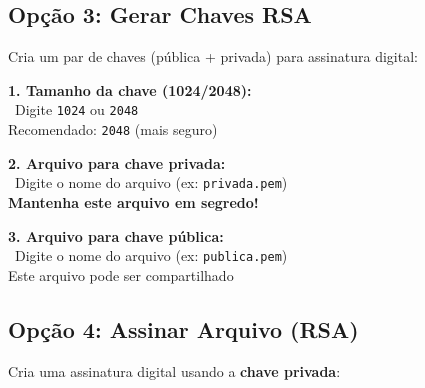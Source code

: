 \documentclass[12pt,a4paper]{article}
\begin{document}
\subsection{Opção 3: Gerar Chaves RSA}

Cria um par de chaves (pública + privada) para assinatura digital:

\begin{tcolorbox}[colback=warningorange!10,colframe=warningorange,title={\faKey\ Campos para Geração RSA}]

\textbf{1. Tamanho da chave (1024/2048):}\\
\quad \faHashtag\ Digite \texttt{1024} ou \texttt{2048}\\
\quad Recomendado: \texttt{2048} (mais seguro)

\textbf{2. Arquivo para chave privada:}\\
\quad \faLock\ Digite o nome do arquivo (ex: \texttt{privada.pem})\\
\quad \textbf{Mantenha este arquivo em segredo!}

\textbf{3. Arquivo para chave pública:}\\
\quad \faUnlock\ Digite o nome do arquivo (ex: \texttt{publica.pem})\\
\quad Este arquivo pode ser compartilhado

\end{tcolorbox}

\subsection{Opção 4: Assinar Arquivo (RSA)}

Cria uma assinatura digital usando a \textbf{chave privada}:
\end{document}

